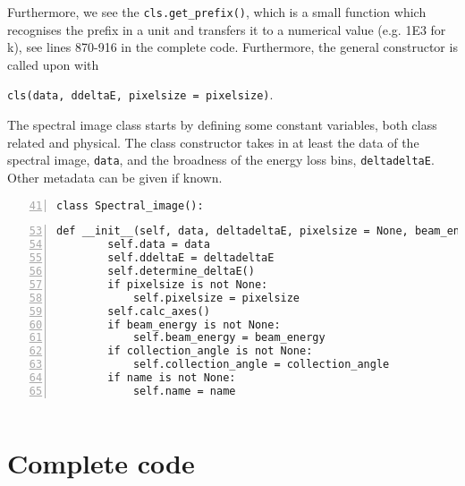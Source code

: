 \documentclass{article}
\begin{document}
Furthermore, we see the \verb|cls.get_prefix()|, which is a small function which recognises the prefix in a unit and transfers it to a numerical value (e.g. 1E3 for k), see lines 870-916 in the complete code. Furthermore, the general constructor is called upon with

\verb|cls(data, ddeltaE, pixelsize = pixelsize)|.

The spectral image class starts by defining some constant variables, both class related and physical. The class constructor takes in at least the data of the spectral image, \verb|data|, and the broadness of the energy loss bins, \verb|deltadeltaE|. Other metadata can be given if known. 

\begin{lstlisting}[numbers=left, firstnumber=41]
class Spectral_image():
\end{lstlisting}
\begin{lstlisting}[numbers=left, firstnumber=53]
    def __init__(self, data, deltadeltaE, pixelsize = None, beam_energy = None, collection_angle = None, name = None):
        self.data = data
        self.ddeltaE = deltadeltaE
        self.determine_deltaE()
        if pixelsize is not None:
            self.pixelsize = pixelsize
        self.calc_axes()
        if beam_energy is not None:
            self.beam_energy = beam_energy
        if collection_angle is not None:
            self.collection_angle = collection_angle
        if name is not None:
            self.name = name

\end{lstlisting}


\begin{lstlisting}[numbers=left, firstnumber=100]
\end{lstlisting}

\section{Complete code}
%
\end{document}
